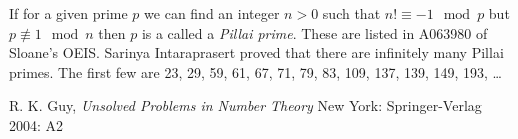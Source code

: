\documentclass[12pt]{article}
\begin{document}
If for a given prime $p$ we can find an integer $n > 0$ such that $n! \equiv -1 \mod p$ but $p \not\equiv 1 \mod n$ then $p$ is a called a {\em Pillai prime}. These are listed in A063980 of Sloane's OEIS. Sarinya Intaraprasert proved that there are infinitely many Pillai primes. The first few are 23, 29, 59, 61, 67, 71, 79, 83, 109, 137, 139, 149, 193, \ldots

\begin{thebibliography}{2}
 R. K. Guy, {\it Unsolved Problems in Number Theory} New York: Springer-Verlag 2004: A2
\end{thebibliography}
\end{document}
